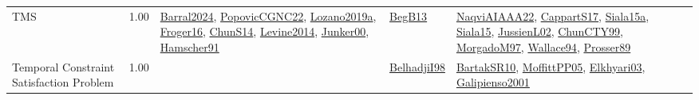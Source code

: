 {\begin{longtable}{p{3cm}r>{\raggedright\arraybackslash}p{6cm}>{\raggedright\arraybackslash}p{6cm}>{\raggedright\arraybackslash}p{8cm}}
\index{TMS}\index{Classification!TMS}TMS &  1.00 & \hyperref[detail:Barral2024]{Barral2024}, \hyperref[detail:PopovicCGNC22]{PopovicCGNC22}, \hyperref[detail:Lozano2019a]{Lozano2019a}, \hyperref[detail:Froger16]{Froger16}, \hyperref[detail:ChunS14]{ChunS14}, \hyperref[detail:Levine2014]{Levine2014}, \hyperref[detail:Junker00]{Junker00}, \hyperref[detail:Hamscher91]{Hamscher91} & \hyperref[detail:BegB13]{BegB13} & \hyperref[detail:NaqviAIAAA22]{NaqviAIAAA22}, \hyperref[detail:CappartS17]{CappartS17}, \hyperref[detail:Siala15a]{Siala15a}, \hyperref[detail:Siala15]{Siala15}, \hyperref[detail:JussienL02]{JussienL02}, \hyperref[detail:ChunCTY99]{ChunCTY99}, \hyperref[detail:MorgadoM97]{MorgadoM97}, \hyperref[detail:Wallace94]{Wallace94}, \hyperref[detail:Prosser89]{Prosser89}\\
\index{Temporal Constraint Satisfaction Problem}\index{Classification!Temporal Constraint Satisfaction Problem}Temporal Constraint Satisfaction Problem &  1.00 &  & \hyperref[detail:BelhadjiI98]{BelhadjiI98} & \hyperref[detail:BartakSR10]{BartakSR10}, \hyperref[detail:MoffittPP05]{MoffittPP05}, \hyperref[detail:Elkhyari03]{Elkhyari03}, \hyperref[detail:Galipienso2001]{Galipienso2001}\\

\end{longtable}}
